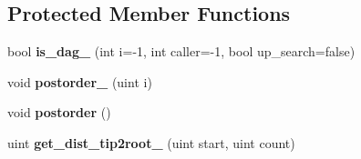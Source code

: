 \subsection*{Protected Member Functions}
\begin{DoxyCompactItemize}
\item 
\mbox{\label{classTree_aa6e923c9b6475afca2763d2594500f02}} 
bool {\bfseries is\+\_\+dag\+\_\+} (int i=-\/1, int caller=-\/1, bool up\+\_\+search=false)
\item 
\mbox{\label{classTree_a350ba9e934819f3591522f97af73ee5a}} 
void {\bfseries postorder\+\_\+} (uint i)
\item 
\mbox{\label{classTree_ab71c8e4ee214eb2fcbeb2d954d79dd62}} 
void {\bfseries postorder} ()
\item 
\mbox{\label{classTree_ac6bbe62025b5492cc8c47025e7a6390f}} 
uint {\bfseries get\+\_\+dist\+\_\+tip2root\+\_\+} (uint start, uint count)
\end{DoxyCompactItemize}
